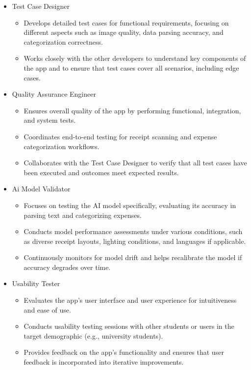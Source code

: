 \documentclass[12pt, titlepage]{article}
\begin{document}
\begin{itemize}
	\item Test Case Designer
	\begin{itemize}
		\item Develops detailed test cases for functional requirements, focusing on different aspects such as image quality, data parsing accuracy, and categorization correctness.
		\item Works closely with the other developers to understand key components of the app and to ensure that test cases cover all scenarios, including edge cases.
	\end{itemize}
	\item Quality Assurance Engineer
	\begin{itemize}
		\item Ensures overall quality of the app by performing functional, integration, and system tests.
		\item Coordinates end-to-end testing for receipt scanning and expense categorization workflows.
		\item Collaborates with the Test Case Designer to verify that all test cases have been executed and outcomes meet expected results.
	\end{itemize}
	\item Ai Model Validator
	\begin{itemize}
		\item Focuses on testing the AI model specifically, evaluating its accuracy in parsing text and categorizing expenses.
		\item Conducts model performance assessments under various conditions, such as diverse receipt layouts, lighting conditions, and languages if applicable.
		\item Continuously monitors for model drift and helps recalibrate the model if accuracy degrades over time.
	\end{itemize}
	\item Usability Tester
	\begin{itemize}
		\item Evaluates the app's user interface and user experience for intuitiveness and ease of use.
		\item Conducts usability testing sessions with other students or users in the target demographic (e.g., university students).
		\item Provides feedback on the app's functionality and ensures that user feedback is incorporated into iterative improvements.
	\end{itemize}

\end{itemize}
\end{document}
